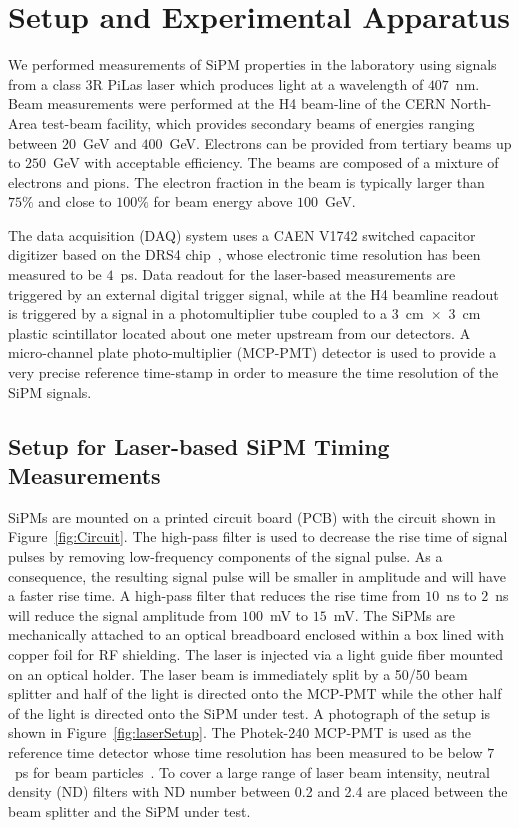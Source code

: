 \section{Setup and Experimental Apparatus }
\label{sec:setup}

We performed measurements of SiPM properties in the laboratory using
signals from a class 3R PiLas laser which produces light at a wavelength of
$407$~nm. Beam measurements were performed at the H4 beam-line of the CERN
North-Area test-beam facility, which provides secondary beams of energies
ranging between $20$~GeV and $400$~GeV. Electrons can be provided from tertiary beams up to 
$250$~GeV with acceptable efficiency. The beams are composed of a mixture of
electrons and pions. The electron fraction in the beam is typically larger than 
$75\%$ and close to $100\%$ for beam energy above $100$~GeV.

The data acquisition (DAQ) system uses a CAEN V1742 switched capacitor digitizer
based on the DRS4 chip~\cite{DRS4}, whose electronic time resolution has been
measured to be $4$~ps. Data readout for the laser-based measurements are
triggered by an external digital trigger signal, while at the H4 beamline
readout is triggered by a signal in a photomultiplier tube coupled to a
$3$~$\mathrm{cm}$~$\times$~$3$~$\mathrm{cm}$ plastic scintillator located about
one meter upstream from our detectors. A micro-channel plate photo-multiplier
(MCP-PMT) detector is used to provide a very precise reference time-stamp in
order to measure the time resolution of the SiPM signals.

\subsection{Setup for Laser-based SiPM Timing Measurements}

SiPMs are mounted on a printed circuit board (PCB) with the circuit shown in
Figure~\ref{fig:Circuit}. The high-pass filter is used to decrease the rise time
of signal pulses by removing low-frequency components of the signal pulse. As a
consequence, the resulting signal pulse will be smaller in amplitude and will
have a faster rise time. A high-pass filter that reduces the rise time from
$10$~ns to $2$~ns will reduce the signal amplitude from $100$~mV to $15$~mV. The
SiPMs are mechanically attached to an optical breadboard enclosed within a box
lined with copper foil for RF shielding. The laser is injected via a light guide
fiber mounted on an optical holder. The laser beam is immediately split by a
50/50 beam splitter and half of the light is directed onto the MCP-PMT while the
other half of the light is directed onto the SiPM under test. A photograph of
the setup is shown in Figure~\ref{fig:laserSetup}. The Photek-240 MCP-PMT is
used as the reference time detector whose time resolution has been measured to
be below $7$~ps for beam particles~\cite{MCPShowerMaxPaper}. To cover a large
range of laser beam intensity, neutral density (ND) filters with ND number
between 0.2 and 2.4 are placed between the beam splitter and the SiPM under
test.

